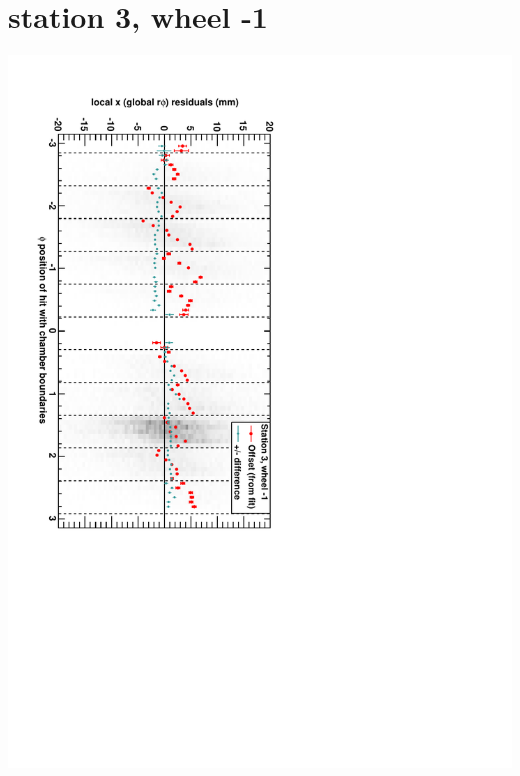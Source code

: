 \documentclass[compress]{beamer}
\begin{document}
\section*{station 3, wheel -1}
\begin{frame} \vfill \mbox{\hspace{-1 cm}\includegraphics[height=1.2\linewidth, angle=90]{DTrphiVsPhi_st3_whB.pdf}} \end{frame}
\end{document}

